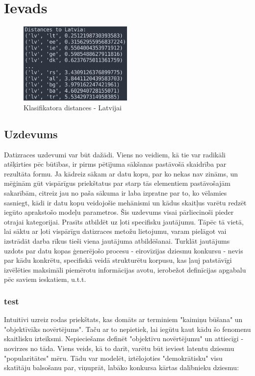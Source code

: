 \documentclass[12pt, a4paper]{article}
\numberwithin{equation}{section} %
\begin{document}
\section{Ievads}



\begin{figure}[h!]
    \centering
    \includegraphics[height=4cm,page=1]{../img/close-far-lv-classifier.png}
    \caption{Klasifikatora distances - Latvijai}
\end{figure}


\subsection{Uzdevums}
Datizraces uzdevumi var būt dažādi. Viens no veidiem, kā tie var radikāli atšķirties pēc būtības, ir pirms pētījuma sākšanas pastāvošā skaidrība par rezultāta formu. Ja kādreiz sākam ar datu kopu, par ko nekas nav zināms, un mēģinām gūt vispārīgus priekštatus par starp tās elementiem pastāvošajām sakarībām, citreiz jau no paša sākuma ir laba izpratne par to, ko vēlamies sasniegt, kādi ir datu kopu veidojošie mehānismi un kādus skaitļus varētu redzēt iegūto aprakstošo modeļu parametros. Šis uzdevums visai pārliecinoši pieder otrajai kategorijai. Prasīts atbildēt uz ļoti specifisku jautājumu. Tāpēc tā vietā, lai sāktu ar ļoti vispārīgu datizraces metožu lietojumu, varam pielāgot vai izstrādāt darba rīkus tieši viena jautājuma atbildēšanai. Turklāt jautājums uzdots par datu kopas ģenerējošo procesu - eirovīzijas dziesmu konkursu - nevis par kādu konkrētu, specifiskā veidā strukturētu korpusu, kas ļauj patstāvīgi izvēlēties maksimāli piemērotu informācijas avotu, ierobežot definīcijas apgabalu pēc saviem ieskatiem, u.t.t.

\subsubsection{test}


Intuitīvi uzreiz rodas priekštats, kas domāts ar terminiem "kaimiņu būšana" un "objektīvāks novērtējums". Taču ar to nepietiek, lai iegūtu kaut kādu šo fenomenu skaitlisku izteiksmi. Nepieciešams definēt "objektīvu novērtējumu" un attiecīgi - novirzes no tāda. Viens veids, kā to darīt, varētu būt ieviest latentu dziesmu "popularitātes" mēru. Tādu var modelēt, iztēlojoties "demokrātisku" visu skatītāju balsošanu par, viņuprāt, labāko konkursa kārtas dalībnieku dziesmu:
\end{document}
